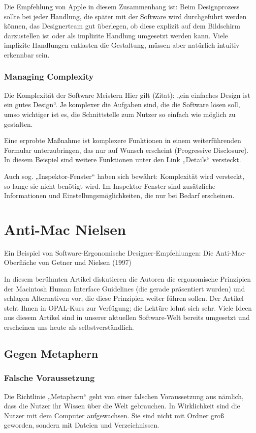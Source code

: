 Die Empfehlung von Apple in diesem Zusammenhang ist: Beim Designprozess sollte bei jeder Handlung, die später mit der Software wird durchgeführt werden können, das Designerteam gut überlegen, ob diese explizit auf dem Bildschirm darzustellen ist oder als implizite Handlung umgesetzt werden kann. Viele implizite Handlungen entlasten die Gestaltung, müssen aber natürlich intuitiv erkennbar sein.

\subsubsection*{Managing Complexity}
Die Komplexität der Software Meistern
Hier gilt (Zitat): „ein einfaches Design ist ein gutes Design“. Je komplexer die Aufgaben sind, die die Software lösen soll, umso wichtiger ist es, die Schnittstelle zum Nutzer so einfach wie möglich zu gestalten.

Eine erprobte Maßnahme ist komplexere Funktionen in einem weiterführenden Formular unterzubringen, das nur auf Wunsch erscheint (Progressive Disclosure). In diesem Beispiel sind weitere Funktionen unter den Link „Details“ versteckt.

Auch sog. „Inspektor-Fenster“ haben sich bewährt: Komplexität wird versteckt, so lange sie nicht benötigt wird. Im Inspektor-Fenster sind zusätzliche Informationen und Einstellungsmöglichkeiten, die nur bei Bedarf erscheinen.

\section{Anti-Mac Nielsen}
Ein Beispiel von Software-Ergonomische Designer-Empfehlungen: Die Anti-Mac-Oberfläche von Getner und Nielsen (1997)

In diesem berühmten Artikel diskutieren die Autoren die ergonomische Prinzipien der Macintosh Human Interface Guidelines (die gerade präsentiert wurden) und schlagen Alternativen vor, die diese Prinzipien weiter führen sollen. Der Artikel steht Ihnen in OPAL-Kurs zur Verfügung; die Lektüre lohnt sich sehr. Viele Ideen aus diesem Artikel sind in unserer aktuellen Software-Welt bereits umgesetzt und erscheinen uns heute als selbstverständlich. 
\subsection{Gegen Metaphern}
\subsubsection*{Falsche Voraussetzung}
Die Richtlinie „Metaphern“ geht von einer falschen Voraussetzung aus nämlich, dass die Nutzer ihr Wissen über die Welt gebrauchen. In Wirklichkeit sind die Nutzer mit dem Computer aufgewachsen. Sie sind nicht mit Ordner groß geworden, sondern mit Dateien und Verzeichnissen.
